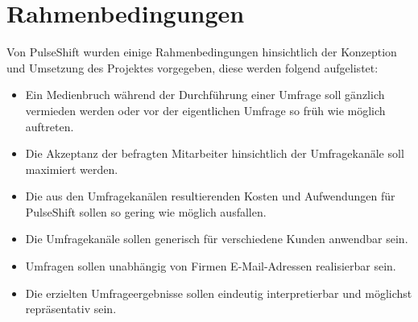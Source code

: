 \section{Rahmenbedingungen}

Von PulseShift wurden einige Rahmenbedingungen hinsichtlich der Konzeption und Umsetzung des Projektes vorgegeben, diese werden folgend aufgelistet:
\begin{itemize}
\item Ein Medienbruch während der Durchführung einer Umfrage soll gänzlich vermieden werden oder vor der eigentlichen Umfrage so früh wie möglich auftreten.
\item Die Akzeptanz der befragten Mitarbeiter hinsichtlich der Umfragekanäle soll maximiert werden.
\item Die aus den Umfragekanälen resultierenden Kosten und Aufwendungen für PulseShift sollen so gering wie möglich ausfallen.
\item Die Umfragekanäle sollen generisch für verschiedene Kunden anwendbar sein.
\item Umfragen sollen unabhängig von Firmen E-Mail-Adressen realisierbar sein.
\item Die erzielten Umfrageergebnisse sollen eindeutig interpretierbar und möglichst repräsentativ sein.
\end{itemize}
